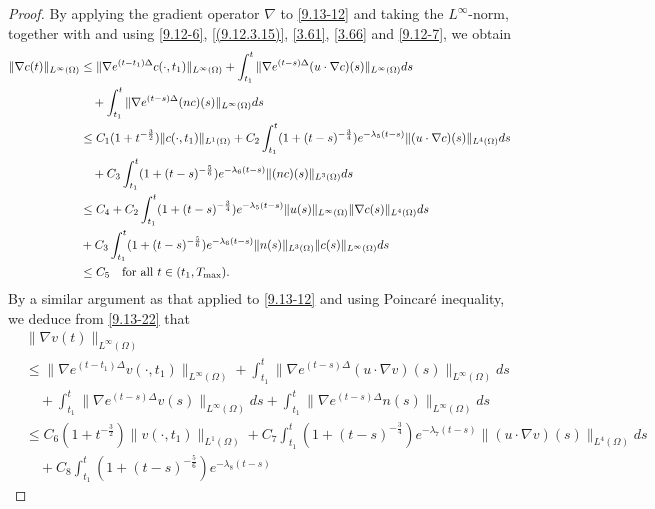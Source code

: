 \documentclass[reqno]{amsart}
\begin{document}
\begin{proof}
By applying the gradient operator $\nabla$ to \eqref{9.13-12} and taking the 
$L^\infty$-norm, together with and using \eqref{9.12-6}, \eqref{(9.12.3.15)},
 \eqref{3.61}, \eqref{3.66} and \eqref{9.12-7}, we obtain
\begin{equation} \label{3.71}
\begin{aligned}
\|\nabla c(t)\|_{L^\infty(\Omega)}
&\leq \| \nabla e^{(t-t_1)\Delta} c(\cdot,t_1) \|_{L^\infty(\Omega)}
+ \int_{t_1}^t \| \nabla e^{(t - s)\Delta} (u \cdot \nabla c)(s) \|_{L^\infty(\Omega)} ds\\
&\quad + \int_{t_1}^t \| \nabla e^{(t - s)\Delta} (n c)(s)\|_{L^\infty(\Omega)} ds \\
&\leq C_1 ( 1 + t^{-\frac{3}{2}}) \| c(\cdot,t_1)\|_{L^1(\Omega)}
 + C_2 \int_{t_1}^t ( 1 + (t - s)^{-\frac{3}{4}} ) e^{-\lambda_5(t - s)}
  \| (u \cdot \nabla c)(s) \|_{L^4(\Omega)} ds \\
&\quad + C_3 \int_{t_1}^t ( 1 + (t - s)^{-\frac{5}{6}} ) e^{-\lambda_6(t - s)}
 \| (n c)(s) \|_{L^3(\Omega)} ds  \\
&\leq C_4 + C_2 \int_{t_1}^t ( 1 + (t - s)^{-\frac{3}{4}} ) e^{-\lambda_5(t - s)}
 \| u(s) \|_{L^\infty(\Omega)} \| \nabla c(s) \|_{L^4(\Omega)} ds \nonumber\\
&+ C_3 \int_{t_1}^t ( 1 + (t - s)^{-\frac{5}{6}} ) e^{-\lambda_6(t - s)}
 \| n(s) \|_{L^3(\Omega)} \| c(s) \|_{L^\infty(\Omega)} ds \\
&\leq C_5  \quad  \text{for all } t \in (t_1, T_{\rm max}).
\end{aligned}
\end{equation}
By a similar argument as that applied to \eqref{9.13-12} and using Poincar\'e
inequality, we deduce from \eqref{9.13-22} that
\begin{equation} \label{3.72}
\begin{aligned}
&\|\nabla v(t)\|_{L^\infty(\Omega)}\\
&\leq \| \nabla e^{(t-t_1)\Delta} v(\cdot, t_1) \|_{L^\infty(\Omega)}
+ \int_{t_1}^t \| \nabla e^{(t - s)\Delta} (u \cdot \nabla v)(s) \|_{L^\infty(\Omega)}ds
 \\
&\quad + \int_{t_1}^t \| \nabla e^{(t - s)\Delta} v(s) \|_{L^\infty(\Omega)} ds
+ \int_{t_1}^t \| \nabla e^{(t - s)\Delta} n(s) \|_{L^\infty(\Omega)} ds \\
&\leq C_6 ( 1 + t^{-\frac{3}{2}} ) \|v(\cdot, t_1)\|_{L^1(\Omega)}
 + C_7 \int_{t_1}^t ( 1 + (t - s)^{-\frac{3}{4}} ) e^{-\lambda_7(t - s)} \| (u \cdot \nabla
v)(s) \|_{L^4(\Omega)} ds  \\
&\quad + C_8 \int_{t_1}^t ( 1 + (t - s)^{-\frac{5}{6}} ) e^{-\lambda_8(t - s)}

\end{aligned}
\end{equation}
\end{proof}
\end{document}
